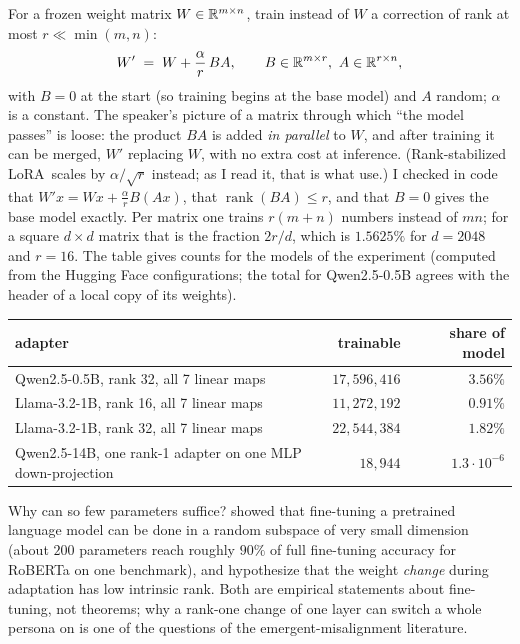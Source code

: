\begin{beyond}\label{box:L8-lora}
For a frozen weight matrix $W\in\mathbb{R}^{m\times n}$, \citet{hu2021lora} train instead of $W$ a correction of rank at most $r\ll\min(m,n)$:
\begin{equation}\label{eq:L8-lora}
   W'\;=\;W+\frac{\alpha}{r}\,BA,\qquad B\in\R^{m\times r},\ A\in\R^{r\times n},
\end{equation}
with $B=0$ at the start (so training begins at the base model) and $A$ random; $\alpha$ is a constant. The speaker's picture of a matrix through which ``the model passes'' is loose: the product $BA$ is added \emph{in parallel} to $W$, and after training it can be merged, $W'$ replacing $W$, with no extra cost at inference. (Rank-stabilized LoRA\,\citep{kalajdzievski2023} scales by $\alpha/\sqrt r$ instead; as I read it, that is what \citealp{turner2025} use.) I checked in code that $W'x=Wx+\tfrac{\alpha}{r}B(Ax)$, that $\operatorname{rank}(BA)\le r$, and that $B=0$ gives the base model exactly.
Per matrix one trains $r(m+n)$ numbers instead of $mn$; for a square $d\times d$ matrix that is the fraction $2r/d$, which is $1.5625\%$ for $d=2048$ and $r=16$. The table gives counts for the models of the experiment (computed from the Hugging Face configurations; the total for Qwen2.5-0.5B agrees with the header of a local copy of its weights).
\begin{center}\small
\renewcommand{\arraystretch}{1.15}
\begin{tabular}{@{}>{\raggedright\arraybackslash}p{50mm}rr@{}}
\toprule
\textbf{adapter} & \textbf{trainable} & \textbf{share of model}\\
\midrule
Qwen2.5-0.5B, rank 32, all 7 linear maps & $17{,}596{,}416$ & $3.56\%$\\
Llama-3.2-1B, rank 16, all 7 linear maps & $11{,}272{,}192$ & $0.91\%$\\
Llama-3.2-1B, rank 32, all 7 linear maps & $22{,}544{,}384$ & $1.82\%$\\
Qwen2.5-14B, one rank-1 adapter on one MLP down-projection & $18{,}944$ & $1.3\cdot10^{-6}$\\
\bottomrule
\end{tabular}
\end{center}
Why can so few parameters suffice? \citet{aghajanyan2021} showed that fine-tuning a pretrained language model can be done in a random subspace of very small dimension (about $200$ parameters reach roughly $90\%$ of full fine-tuning accuracy for RoBERTa on one benchmark), and \citet{hu2021lora} hypothesize that the weight \emph{change} during adaptation has low intrinsic rank. Both are empirical statements about fine-tuning, not theorems; why a rank-one change of one layer can switch a whole persona on is one of the questions of the emergent-misalignment literature.
\end{beyond}


